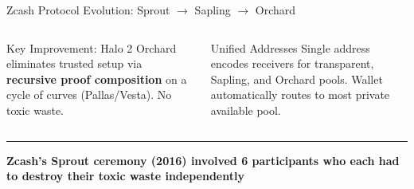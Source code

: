 \documentclass[8pt,aspectratio=169]{beamer}
\newcommand{\bottomnote}[1]{\vfill\vspace{-2mm}\textcolor{mllavender2}{\rule{\textwidth}{0.4pt}}\vspace{1mm}\footnotesize\textbf{#1}}
\begin{document}
\begin{frame}{Zcash Protocol Evolution: Sprout $\to$ Sapling $\to$ Orchard}
\begin{columns}[T]
\begin{exampleblock}{\footnotesize Key Improvement: Halo 2}
\footnotesize
Orchard eliminates trusted setup via \textbf{recursive proof composition} on a cycle of curves (Pallas/Vesta). No toxic waste.
\end{exampleblock}
\begin{block}{\footnotesize Unified Addresses}
\footnotesize
Single address encodes receivers for transparent, Sapling, and Orchard pools. Wallet automatically routes to most private available pool.
\end{block}
\end{columns}
\bottomnote{Zcash's Sprout ceremony (2016) involved 6 participants who each had to destroy their toxic waste independently}
\end{frame}
\end{document}

